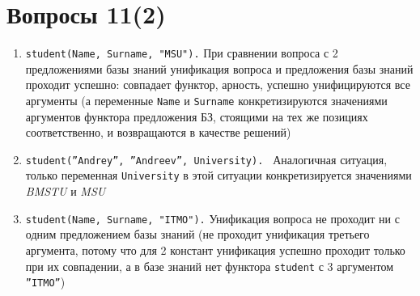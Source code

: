 \section{Вопросы 11(2)}
\begin{enumerate}
    \item \texttt{student(Name, Surname, "MSU").}
        При сравнении вопроса с 2 предложениями базы знаний унификация вопроса и предложения базы знаний проходит успешно: совпадает функтор, арность, успешно унифицируются все аргументы (а переменные \texttt{Name} и \texttt{Surname} конкретизируются значениями аргументов функтора предложения БЗ, стоящими на тех же позициях соответственно, и возвращаются в качестве решений)
    \item \texttt{student(''Andrey'', ''Andreev'', University). }
        Аналогичная ситуация, только переменная \texttt{University} в этой ситуации конкретизируется значениями \textit{BMSTU} и \textit{MSU}
    \item \texttt{student(Name, Surname, "ITMO").}
        Унификация вопроса не проходит ни с одним предложением базы знаний (не проходит унификация третьего аргумента, потому что для 2 констант унификация успешно проходит только при их совпадении, а в базе знаний нет функтора \texttt{student} с 3 аргументом \texttt{''ITMO''})
\end{enumerate}